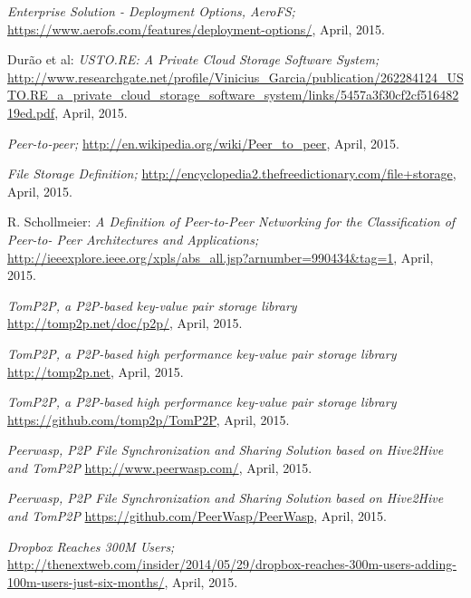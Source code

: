 \begin{thebibliography}{99}
		\emph{Enterprise Solution - Deployment Options, AeroFS;}
		\url{https://www.aerofs.com/features/deployment-options/},
		April, 2015.
		
		Dur\~ao et al:
		\emph{USTO.RE: A Private Cloud Storage Software System;}
		\url{http://www.researchgate.net/profile/Vinicius_Garcia/publication/262284124_USTO.RE_a_private_cloud_storage_software_system/links/5457a3f30cf2cf51648219ed.pdf},
		April, 2015.
		
		\emph{Peer-to-peer;}
		\url{http://en.wikipedia.org/wiki/Peer_to_peer},
		April, 2015.
		
		\emph{File Storage Definition;}
		\url{http://encyclopedia2.thefreedictionary.com/file+storage},
		April, 2015.
		
		R. Schollmeier:
		\emph{A Definition of Peer-to-Peer Networking for the Classification of Peer-to- Peer Architectures and Applications;}
		\url{http://ieeexplore.ieee.org/xpls/abs_all.jsp?arnumber=990434&tag=1},
		April, 2015.
		
		\emph{TomP2P, a P2P-based key-value pair storage library}
		\url{http://tomp2p.net/doc/p2p/},
		April, 2015.

		\emph{TomP2P, a P2P-based high performance key-value pair storage library}
		\url{http://tomp2p.net},
		April, 2015.

		\emph{TomP2P, a P2P-based high performance key-value pair storage library}
		\url{https://github.com/tomp2p/TomP2P},
		April, 2015.

		\emph{Peerwasp, P2P File Synchronization and Sharing Solution based on Hive2Hive and TomP2P}
		\url{http://www.peerwasp.com/},
		April, 2015.

		\emph{Peerwasp, P2P File Synchronization and Sharing Solution based on Hive2Hive and TomP2P}
		\url{https://github.com/PeerWasp/PeerWasp},
		April, 2015.
		
		\emph{Dropbox Reaches 300M Users;}
		\url{http://thenextweb.com/insider/2014/05/29/dropbox-reaches-300m-users-adding-100m-users-just-six-months/},
		April, 2015.

\end{thebibliography}